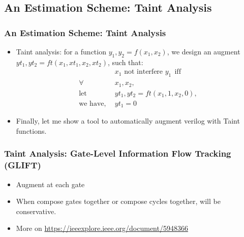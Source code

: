 \documentclass{beamer}
\begin{document}
\subsection{An Estimation Scheme: Taint Analysis}

\begin{frame}
\frametitle{An Estimation Scheme: Taint Analysis}
\begin{itemize}
  \item<1-> Taint analysis: for a function $y_1, y_2 = f(x_1, x_2)$, we design an augment $yt_1, yt_2 = ft(x_1, xt_1, x_2, xt_2)$, such that:
  \begin{align*}
    & \text{$x_1$ not interfere $y_1$} ~~ \text{iff} \\
    \forall ~~& x_1, x_2, \\
    \text{let} ~~& yt_1, yt_2 = ft(x_1, 1, x_2, 0), \\
    \text{we have}, ~~& yt_1 = 0
  \end{align*}
  \item<2-> Finally, let me show a tool to automatically augment verilog with Taint functions. 
\end{itemize}
\end{frame}




\begin{frame}
\frametitle{Taint Analysis: Gate-Level Information Flow Tracking (GLIFT)}
\begin{itemize}
  \item<1-> Augment at each gate
  \item<2-> When compose gates together or compose cycles together, will be conservative.
  \item<3-> More on \url{https://ieeexplore.ieee.org/document/5948366}
\end{itemize}
\end{frame}




\end{document}
